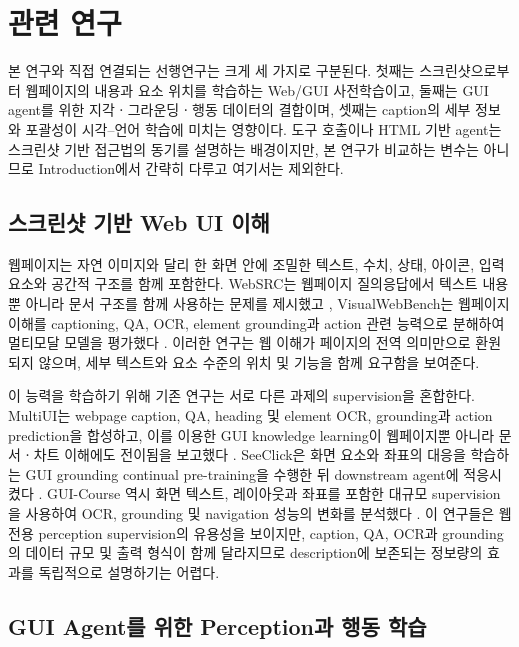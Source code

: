 \section{관련 연구}
\label{sec:related_work_draft}

본 연구와 직접 연결되는 선행연구는 크게 세 가지로 구분된다. 첫째는
스크린샷으로부터 웹페이지의 내용과 요소 위치를 학습하는 Web/GUI
사전학습이고, 둘째는 GUI agent를 위한 지각ㆍ그라운딩ㆍ행동 데이터의
결합이며, 셋째는 caption의 세부 정보와 포괄성이 시각--언어 학습에
미치는 영향이다. 도구 호출이나 HTML 기반 agent는 스크린샷 기반
접근법의 동기를 설명하는 배경이지만, 본 연구가 비교하는 변수는 아니므로
Introduction에서 간략히 다루고 여기서는 제외한다.

\subsection{스크린샷 기반 Web UI 이해}

웹페이지는 자연 이미지와 달리 한 화면 안에 조밀한 텍스트, 수치,
상태, 아이콘, 입력 요소와 공간적 구조를 함께 포함한다. WebSRC는
웹페이지 질의응답에서 텍스트 내용뿐 아니라 문서 구조를 함께 사용하는
문제를 제시했고 \citep{chen2021websrc}, VisualWebBench는 웹페이지
이해를 captioning, QA, OCR, element grounding과 action 관련 능력으로
분해하여 멀티모달 모델을 평가했다 \citep{liu2024visualwebbench}.
이러한 연구는 웹 이해가 페이지의 전역 의미만으로 환원되지 않으며,
세부 텍스트와 요소 수준의 위치 및 기능을 함께 요구함을 보여준다.

이 능력을 학습하기 위해 기존 연구는 서로 다른 과제의 supervision을
혼합한다. MultiUI는 webpage caption, QA, heading 및 element OCR,
grounding과 action prediction을 합성하고, 이를 이용한 GUI knowledge
learning이 웹페이지뿐 아니라 문서ㆍ차트 이해에도 전이됨을 보고했다
\citep{liu2025multiui}. SeeClick은 화면 요소와 좌표의 대응을 학습하는
GUI grounding continual pre-training을 수행한 뒤 downstream agent에
적응시켰다 \citep{cheng2024seeclick}. GUI-Course 역시 화면 텍스트,
레이아웃과 좌표를 포함한 대규모 supervision을 사용하여 OCR,
grounding 및 navigation 성능의 변화를 분석했다
\citep{chen2025guicourse}. 이 연구들은 웹 전용 perception
supervision의 유용성을 보이지만, caption, QA, OCR과 grounding의
데이터 규모 및 출력 형식이 함께 달라지므로 description에 보존되는
정보량의 효과를 독립적으로 설명하기는 어렵다.

\subsection{GUI Agent를 위한 Perception과 행동 학습}

